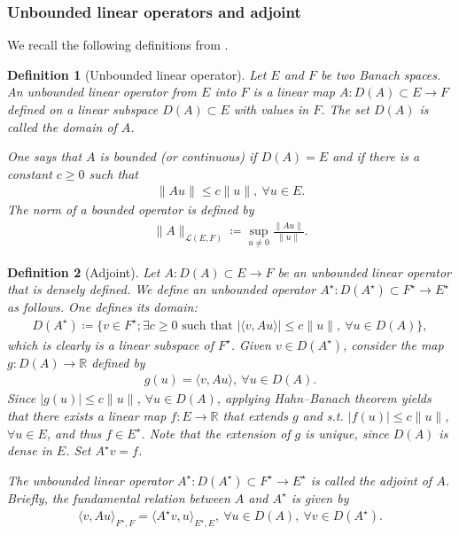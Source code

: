 \documentclass[oneside,11pt]{book}
\numberwithin{equation}{section}
\newtheorem{definition}{Definition}[section]
\begin{document}
\subsubsection{Unbounded linear operators and adjoint}
We recall the following definitions from \cite[Sect. 2.6]{Brezis2011}.
\begin{definition}[Unbounded linear operator]
    Let $E$ and $F$ be two Banach spaces. An \emph{unbounded linear operator} from $E$ into $F$ is a linear map $A:D(A)\subset E\to F$ defined on a linear subspace $D(A)\subset E$ with values in $F$. The set $D(A)$ is called the \emph{domain} of $A$.
    
    One says that $A$ is \emph{bounded} (or \emph{continuous}) if $D(A) = E$ and if there is a constant $c\ge 0$ such that
    \begin{align*}
        \|Au\|\le c\|u\|,\ \forall u\in E.
    \end{align*}
    The norm of a bounded operator is defined by
    \begin{align*}
        \|A\|_{\mathcal{L}(E,F)}\coloneqq\sup_{u\ne 0} \frac{\|Au\|}{\|u\|}.
    \end{align*}
\end{definition}

\begin{definition}[Adjoint]
    Let $A:D(A)\subset E\to F$ be an unbounded linear operator that is \emph{densely defined}. We define an unbounded operator $A^\star:D(A^\star)\subset F^\star\to E^\star$ as follows. One defines its domain:
    \begin{align*}
        D(A^\star)\coloneqq\{v\in F^\star;\exists c\ge 0\mbox{ such that }|\langle v,Au\rangle|\le c\|u\|,\ \forall u\in D(A)\},
    \end{align*}
    which is clearly is a linear subspace of $F^\star$. Given $v\in D(A^\star)$, consider the map $g:D(A)\to\mathbb{R}$ defined by
    \begin{align*}
        g(u) = \langle v,Au\rangle,\ \forall u\in D(A).
    \end{align*}
    Since $|g(u)|\le c\|u\|$, $\forall u\in D(A)$, applying Hahn--Banach theorem yields that there exists a linear map $f:E\to\mathbb{R}$ that extends $g$ and s.t. $|f(u)|\le c\|u\|$, $\forall u\in E$, and thus $f\in E^\star$. Note that the extension of $g$ is unique, since $D(A)$ is dense in $E$. Set $A^\star v = f$.
    
    The unbounded linear operator $A^\star:D(A^\star)\subset F^\star\to E^\star$ is called the \emph{adjoint} of $A$. Briefly, the fundamental relation between $A$ and $A^\star$ is given by
    \begin{align*}
        \langle v,Au\rangle_{F^\star,F} = \langle A^\star v,u\rangle_{E^\star,E},\ \forall u\in D(A),\ \forall v\in D(A^\star).
    \end{align*}
\end{definition}
\end{document}
